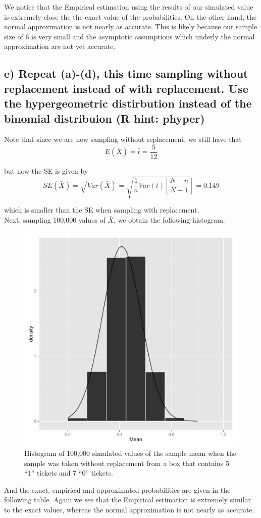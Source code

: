 \documentclass[11pt]{article}
\begin{document}
\noindent We notice that the Empirical estimation using the results of our simulated value is extremely close the the exact value of the probabilities. On the other hand, the normal approximation is not nearly as accurate. This is likely because our sample size of 6 is very small and the asymptotic assumptions which underly the normal approximation are not yet accurate.



\subsection*{e) Repeat (a)-(d), this time sampling without replacement instead of with replacement. Use the hypergeometric distirbution instead of the binomial distribuion (R hint: phyper)}


\noindent Note that since we are now sampling without replacement, we still have that
$$E(\bar{X}) = \bar{t} = \frac{5}{12}$$

\noindent but now the SE is given by
$$SE(\bar{X}) = \sqrt{Var(\bar{X})} = \sqrt{\frac{1}{n} Var(t) \left[\frac{N - n}{N - 1}\right]} = 0.149$$

\noindent which is smaller than the SE when sampling with replacement.\\

\noindent Next, sampling 100,000 values of $\bar{X}$, we obtain the following histogram.

\begin{figure}[H]
\centering
\includegraphics[width = .5\textwidth]{histogram_1e-1.pdf}
\caption{Histogram of 100,000 simulated values of the sample mean when the sample was taken without replacement from a box that contains 5 ``1'' tickets and 7 ``0'' tickets.}
\end{figure}

\noindent And the exact, empirical and approximated probabilities are given in the following table. Again we see that the Empirical estimation is extremely similar to the exact values, whereas the normal approximation is not nearly as accurate.
\end{document}
